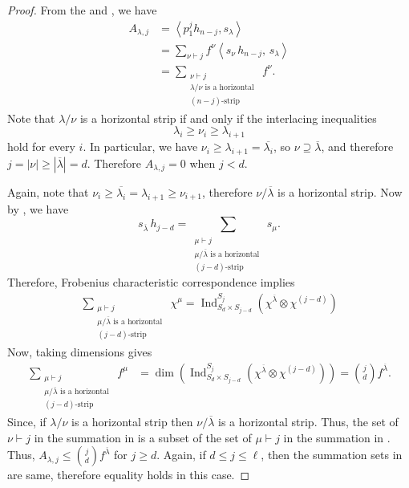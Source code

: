 \documentclass[12pt]{article}
\theoremstyle{definition}
\newcommand{\1}{\mathbf 1}
\newcommand{\Ind}{\operatorname{Ind}}
\begin{document}
\begin{proof} From the  and , we have
    \begin{align}
        A_{\lambda,j}&=\left\langle p_1^j h_{n-j}, s_\lambda \right\rangle\nonumber\\
        &=\sum_{\nu\vdash j}f^{\nu}\left\langle s_{\nu} \,h_{n-j},\,s_{\lambda} \right\rangle\nonumber\\
        &=\sum_{\substack{\nu\vdash j\\ \lambda/\nu \text{ is a horizontal }\\(n-j)\text{-strip}}}f^{\nu}.\label{eq:A_lambda_j_expression}
    \end{align}
    Note that $\lambda/\nu$ is a horizontal strip if and only if the interlacing inequalities
    $$\lambda_i\geq \nu_i\geq \lambda_{i+1}$$
    hold for every $i$. In particular, we have $ \nu_i\geq \lambda_{i+1}=\overline{\lambda_i}$, so $\nu\supseteq \overline{\lambda}$, and therefore $j=|\nu|\geq |\overline{\lambda}|=d$. Therefore $A_{\lambda,j}=0$ when $j<d$.

    Again, note that $\nu_i\geq \overline{\lambda_i}=\lambda_{i+1}\geq \nu_{i+1}$, therefore $\nu/\overline{\lambda}$ is a horizontal strip. Now by , we have 
    \begin{equation*}
        s_{\overline{\lambda}}\, h_{j-d}=\sum_{\substack{\mu\vdash j\\ \mu/\overline{\lambda} \text{ is a horizontal }\\(j-d)\text{-strip}}}s_{\mu}.
    \end{equation*}
    Therefore, Frobenius characteristic correspondence implies
    \begin{align*}
        \sum_{\substack{\mu\vdash j\\ \mu/\overline{\lambda} \text{ is a horizontal }\\(j-d)\text{-strip}}}\chi^{\mu}=\Ind_{S_d\times S_{j-d}}^{S_j}\left(\chi^{\overline{\lambda}}\otimes\chi^{(j-d)}\right)
    \end{align*}
Now, taking dimensions gives
\begin{align}
        \sum_{\substack{\mu\vdash j\\ \mu/\overline{\lambda} \text{ is a horizontal }\\(j-d)\text{-strip}}}f^{\mu}&=\dim\left(\Ind_{S_d\times S_{j-d}}^{S_j}\left(\chi^{\overline{\lambda}}\otimes\chi^{(j-d)}\right)\right)
        =\binom{j}{d}f^{\overline{\lambda}}.\label{eq:s_lambda_h_j-d_pieri_formula}
    \end{align}
Since, if $\lambda/\nu$ is a horizontal strip then $\nu/\overline{\lambda}$ is a horizontal strip. Thus, the set of $\nu\vdash j$ in the summation in  is a subset of the set of  $\mu\vdash j$ in the summation in . Thus, $A_{\lambda,j} \leq \binom{j}{d} f^{\overline{\lambda}}$ for $j \geq d$. Again, if $d\leq j\leq \ell$, then the summation sets in  are same, therefore equality holds in this case.
\end{proof}
\end{document}
